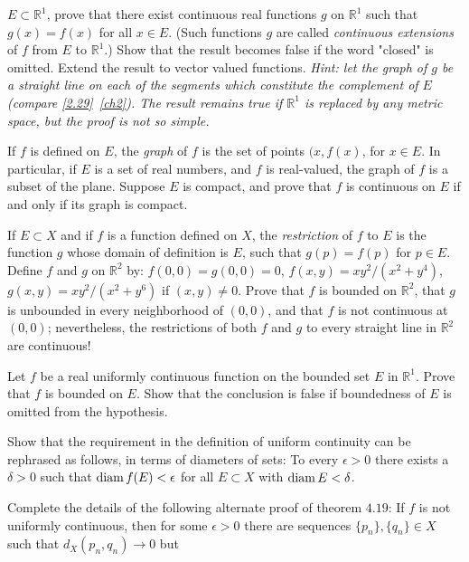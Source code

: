 \begin{exercise}
  \(E\subset\mathbb{R}^1\), prove that there exist continuous real functions
  \(g\) on \(\mathbb{R}^1\) such that \(g(x) = f(x)\) for all \(x\in E\).
  (Such functions \(g\) are called \textit{continuous extensions} of \(f\) from
  \(E\) to \(\mathbb{R}^1\).)
  Show that the result becomes false if the word "closed" is omitted.
  Extend the result to vector valued functions.
  \textit{Hint: let the graph of \(g\) be a straight line on each of the
    segments which constitute the complement of \(E\) (compare
    \cref{2.29}~\cref{ch2}).
    The result remains true if \(\mathbb{R}^1\) is replaced by any metric
    space, but the proof is not so simple.}
\item
  If \(f\) is defined on \(E\), the \textit{graph} of \(f\) is the set of
  points \((x,f(x)\), for \(x\in E\).
  In particular, if \(E\) is a set of real numbers, and \(f\) is real-valued,
  the graph of \(f\) is a subset of the plane.
  Suppose \(E\) is compact, and prove that \(f\) is continuous on \(E\) if and
  only if its graph is compact.
\item
  If \(E\subset X\) and if \(f\) is a function defined on \(X\), the
  \textit{restriction} of \(f\) to \(E\) is the function \(g\) whose domain of
  definition is \(E\), such that \(g(p) = f(p)\) for \(p\in E\).
  Define \(f\) and \(g\) on \(\mathbb{R}^2\) by: \(f(0,0) = g(0,0) = 0\),
  \(f(x,y) = xy^2/(x^2 + y^4)\), \(g(x,y) = xy^2/(x^2 + y^6)\) if
  \((x,y)\neq 0\).
  Prove that \(f\) is bounded on \(\mathbb{R}^2\), that \(g\) is unbounded in
  every neighborhood of \((0,0)\), and that \(f\) is not continuous at
  \((0,0)\); nevertheless, the restrictions of both \(f\) and \(g\) to every
  straight line in \(\mathbb{R}^2\) are continuous!
\item
  Let \(f\) be a real uniformly continuous function on the bounded set \(E\) in
  \(\mathbb{R}^1\).
  Prove that \(f\) is bounded on \(E\).
  Show that the conclusion is false if boundedness of \(E\) is omitted from the
  hypothesis.
\item
  \label{4.9}
  Show that the requirement in the definition of uniform continuity can be
  rephrased as follows, in terms of diameters of sets: To every
  \(\epsilon > 0\) there exists a \(\delta > 0\) such that
  \(\operatorname{diam} f(E) < \epsilon\) for all \(E\subset X\) with \(\operatorname{diam} E < \delta\).
\item
  Complete the details of the following alternate  proof of theorem \(4.19\):
  If \(f\) is not uniformly continuous, then for some \(\epsilon > 0\) there
  are sequences \(\{p_n\},\{q_n\}\in X\) such that \(d_X(p_n,q_n)\to 0\) but

\end{exercise}
